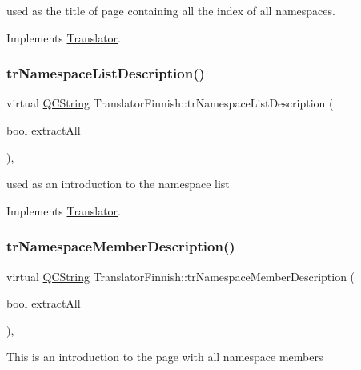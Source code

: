 used as the title of page containing all the index of all namespaces. 

Implements \mbox{\hyperlink{class_translator}{Translator}}.

\mbox{\label{class_translator_finnish_a2b7e5c8d674dacbec553eef64876c077}} 
\subsubsection{\texorpdfstring{trNamespaceListDescription()}{trNamespaceListDescription()}}
{\footnotesize\ttfamily virtual \mbox{\hyperlink{class_q_c_string}{Q\+C\+String}} Translator\+Finnish\+::tr\+Namespace\+List\+Description (\begin{DoxyParamCaption}\item[{bool}]{extract\+All }\end{DoxyParamCaption})\hspace{0.3cm}{\ttfamily [inline]}, {\ttfamily [virtual]}}

used as an introduction to the namespace list 

Implements \mbox{\hyperlink{class_translator}{Translator}}.

\mbox{\label{class_translator_finnish_a510b3c4befa5dd7f52c3109c56aff6c8}} 
\subsubsection{\texorpdfstring{trNamespaceMemberDescription()}{trNamespaceMemberDescription()}}
{\footnotesize\ttfamily virtual \mbox{\hyperlink{class_q_c_string}{Q\+C\+String}} Translator\+Finnish\+::tr\+Namespace\+Member\+Description (\begin{DoxyParamCaption}\item[{bool}]{extract\+All }\end{DoxyParamCaption})\hspace{0.3cm}{\ttfamily [inline]}, {\ttfamily [virtual]}}

This is an introduction to the page with all namespace members 


